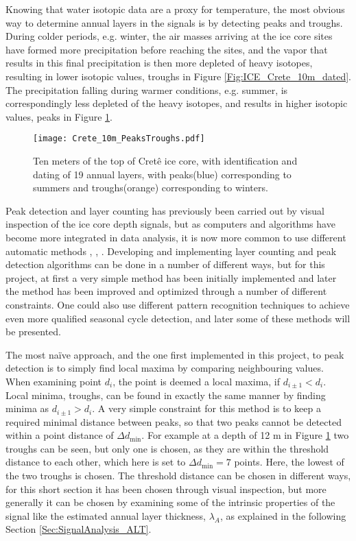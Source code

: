 \documentclass[../../CompleteThesis2/Complete_2ndDraft]{subfiles}
\begin{document}
Knowing that water isotopic data are a proxy for temperature, the most obvious way to determine annual layers in the signals is by detecting peaks and troughs. During colder periods, e.g. winter, the air masses arriving at the ice core sites have formed more precipitation before reaching the sites, and the vapor that results in this final precipitation is then more depleted of heavy isotopes, resulting in lower isotopic values, troughs in Figure \ref{Fig:ICE_Crete_10m_dated}. The precipitation falling during warmer conditions, e.g. summer, is correspondingly less depleted of the heavy isotopes, and results in higher isotopic values, peaks in Figure \ref{Fig:COMPMETH_Crete_10m_PeaksTroughs}.
\begin{figure}[h]
	\centering
	\texttt{[image: Crete\_10m\_PeaksTroughs.pdf]}
	\caption[10 m of Crête core with peaks and troughs]{\small Ten meters of the top of Cretê ice core, with identification and dating of 19 annual layers, with peaks(blue) corresponding to summers and troughs(orange) corresponding to winters.}
	\label{Fig:COMPMETH_Crete_10m_PeaksTroughs}
\end{figure}

Peak detection and layer counting has previously been carried out by visual inspection of the ice core depth signals, but as computers and algorithms have become more integrated in data analysis, it is now more common to use different automatic methods \cite[J. Wheatley, 2015]{Wheatley2015}, \cite[M. Winstrup, 2012]{Winstrup2012}, \cite[S. Rasmussen et al., 2014]{Rasmussen2014}. Developing and implementing layer counting and peak detection algorithms can be done in a number of different ways, but for this project, at first a very simple method has been initially implemented and later the method has been improved and optimized through a number of different constraints. One could also use different pattern recognition techniques to achieve even more qualified seasonal cycle detection, and later some of these methods will be presented.

The most naïve approach, and the one first implemented in this project, to peak detection is to simply find local maxima by comparing neighbouring values. When examining point $d_i$, the point is deemed a local maxima, if $d_{i\pm1} < d_i$. Local minima, troughs, can be found in exactly the same manner by finding minima as $d_{i\pm1} > d_i$. A very simple constraint for this method is to keep a required minimal distance between peaks, so that two peaks cannot be detected within a point distance of $\Delta d_{\text{min}}$. For example at a depth of 12 m in Figure \ref{Fig:COMPMETH_Crete_10m_PeaksTroughs} two troughs can be seen, but only one is chosen, as they are within the threshold distance to each other, which here is set to $\Delta d_{\text{min}} = 7$ points. Here, the lowest of the two troughs is chosen. The threshold distance can be chosen in different ways, for this short section it has been chosen through visual inspection, but more generally it can be chosen by examining some of the intrinsic properties of the signal like the estimated annual layer thickness, $\lambda_A$, as explained in the following Section \ref{Sec:SignalAnalysis_ALT}.
\end{document}
